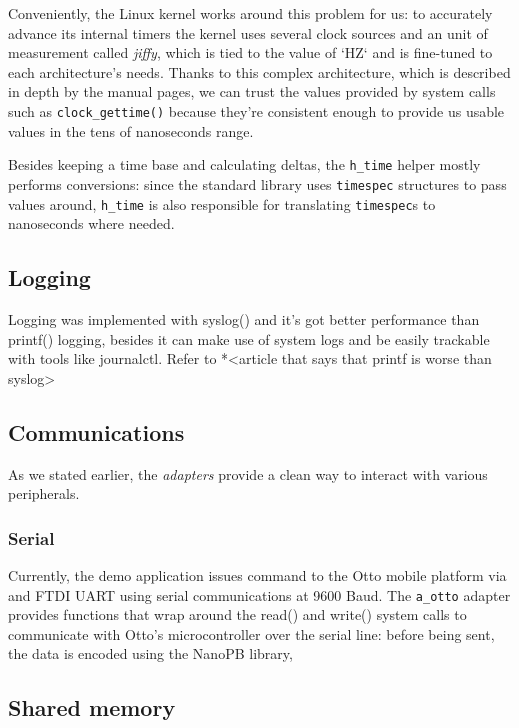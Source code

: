 \documentclass[a4paper,12pt]{report}
\begin{document}
Conveniently, the Linux kernel works around this problem for us: to accurately advance its internal timers the kernel uses several clock sources and an unit of measurement called \textit{jiffy}, which is tied to the value of `HZ` and is fine-tuned to each architecture's needs\cite{elinux-hrts}. Thanks to this complex architecture, which is described in depth by the manual pages\cite{man-clock-getres-2}, we can trust the values provided by system calls such as \texttt{clock\_gettime()} because they're consistent enough to provide us usable values in the tens of nanoseconds range.

Besides keeping a time base and calculating deltas, the \texttt{h\_time} helper mostly performs conversions: since the standard library uses \texttt{timespec} structures to pass values around, \texttt{h\_time} is also responsible for translating \texttt{timespec}s to nanoseconds where needed.  

\subsection{Logging}

Logging was implemented with syslog() and it's got better performance than printf() logging, besides it can make use of system logs and be easily trackable with tools like journalctl. Refer to *<article that says that printf is worse than syslog>

\subsection{Communications}

As we stated earlier, the \textit{adapters} provide a clean way to interact with various peripherals.

\subsubsection{Serial}

Currently, the demo application issues command to the Otto mobile platform via and FTDI UART using serial communications at 9600 Baud. The \texttt{a\_otto} adapter provides functions that wrap around the read() and write() system calls to communicate with Otto's microcontroller over the serial line: before being sent, the data is encoded using the NanoPB library,  

\subsection{Shared memory}
\end{document}
